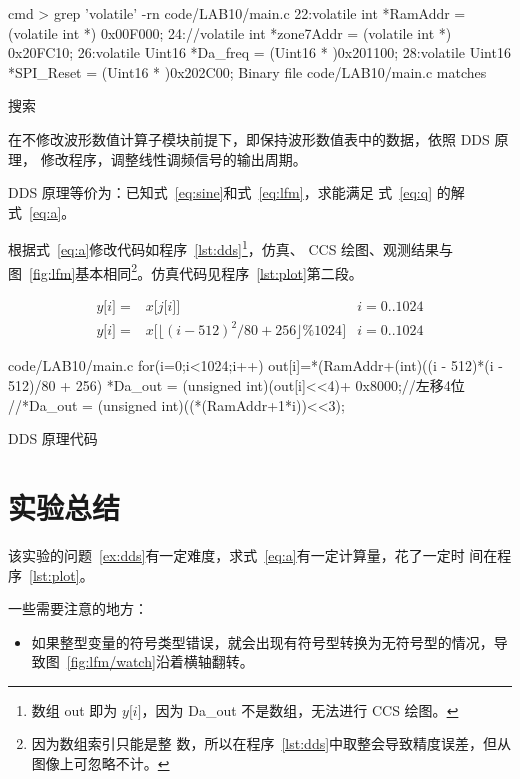 \documentclass[../main]{subfiles}
\begin{document}
\begin{listing}[htbp]
  \centering
\begin{windark}{cmd}
> grep 'volatile' -rn code/LAB10/main.c
22:volatile int *RamAddr = (volatile int *) 0x00F000;
24://volatile int *zone7Addr = (volatile int *) 0x20FC10;
26:volatile Uint16  *Da_freq      = (Uint16 * )0x201100;
28:volatile Uint16  *SPI_Reset   = (Uint16 * )0x202C00;
Binary file code/LAB10/main.c matches
\end{windark}
  \caption{搜索}%
  \label{lst:volatile}
\end{listing}

\begin{Exercise}[label = ex:dds]
  在不修改波形数值计算子模块前提下，即保持波形数值表中的数据，依照 DDS 原理，
  修改程序，调整线性调频信号的输出周期。
\end{Exercise}

\begin{Answer}
  DDS 原理等价为：已知式~\ref{eq:sine}和式~\ref{eq:lfm}，求能满足
  式~\ref{eq:q} 的解式~\ref{eq:a}。

  根据式~\ref{eq:a}修改代码如程序~\ref{lst:dds}\footnote{数组 out 即为
  $y\lbrack i\rbrack$，因为 Da\_out 不是数组，无法进行 CCS 绘图。}，仿真、
  CCS 绘图、观测结果与图~\ref{fig:lfm}基本相同\footnote{因为数组索引只能是整
  数，所以在程序~\ref{lst:dds}中取整会导致精度误差，但从图像上可忽略不计。
}。仿真代码见程序~\ref{lst:plot}第二段。
\end{Answer}

\begin{align}
  \label{eq:q}
  y\lbrack i\rbrack = & x\lbrack j\lbrack i\rbrack\rbrack & i = 0..1024\\
  \label{eq:a}
  y\lbrack i\rbrack = & x\lbrack\lfloor{(i - 512)}^2/80 + 256\rfloor \%
  1024\rbrack & i = 0..1024
\end{align}

\begin{listing}[htbp]
  \centering
\begin{langPyOne}[c][firstnumber = 75]{code/LAB10/main.c}
    	for(i=0;i<1024;i++)
    	{
    		out[i]=*(RamAddr+(int)((i - 512)*(i - 512)/80 + 256)%
    		*Da_out = (unsigned int)(out[i]<<4)+ 0x8000;//左移4位
    		//*Da_out = (unsigned int)((*(RamAddr+1*i))<<3);
    	}
\end{langPyOne}
  \caption{DDS 原理代码}%
  \label{lst:dds}
\end{listing}

\section{实验总结}%
\label{sec:\arabic{chapter}conclusion}

该实验的问题~\ref{ex:dds}有一定难度，求式~\ref{eq:a}有一定计算量，花了一定时
间在程序~\ref{lst:plot}。

一些需要注意的地方：

\begin{itemize}
  \item 如果整型变量的符号类型错误，就会出现有符号型转换为无符号型的情况，导
    致图~\ref{fig:lfm/watch}沿着横轴翻转。
\end{itemize}
\end{document}
